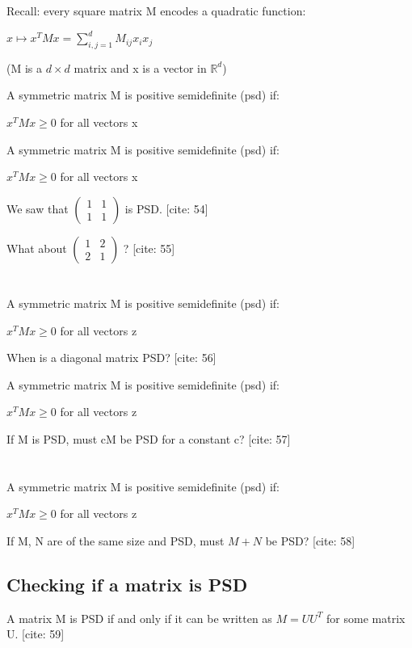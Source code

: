 \documentclass{article}
\begin{document}
Recall: every square matrix M encodes a quadratic function:

$x\mapsto x^{T}Mx=\sum_{i,j=1}^{d}M_{ij}x_{i}x_{j}$

(M is a $d\times d$ matrix and x is a vector in $\mathbb{R}^{d}$)

A symmetric matrix M is positive semidefinite (psd) if:

$x^{T}Mx\ge0$ for all vectors x

A symmetric matrix M is positive semidefinite (psd) if:

$x^{T}Mx\ge0$ for all vectors x

We saw that $\begin{pmatrix}1&1\\ 1&1\end{pmatrix}$ is PSD. [cite: 54]

What about $\begin{pmatrix}1&2\\ 2&1\end{pmatrix}$ ? [cite: 55]

\section{}

A symmetric matrix M is positive semidefinite (psd) if:

$x^{T}Mx\ge0$ for all vectors z

When is a diagonal matrix PSD? [cite: 56]

A symmetric matrix M is positive semidefinite (psd) if:

$x^{T}Mx\ge0$ for all vectors z

If M is PSD, must cM be PSD for a constant c? [cite: 57]

\section{}

A symmetric matrix M is positive semidefinite (psd) if:

$x^{T}Mx\ge0$ for all vectors z

If M, N are of the same size and PSD, must $M+N$ be PSD? [cite: 58]

\subsection{Checking if a matrix is PSD}

A matrix M is PSD if and only if it can be written as $M=UU^{T}$ for some matrix U. [cite: 59]
\end{document}
